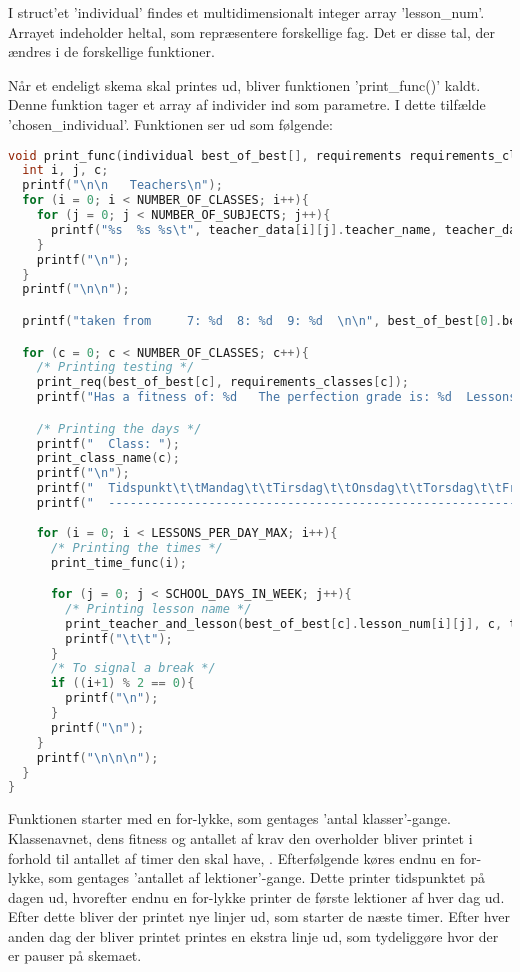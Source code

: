 I struct’et ’individual’ findes et multidimensionalt integer array ’lesson\_num’. Arrayet indeholder heltal, som repræsentere forskellige fag. Det er disse tal, der ændres i de forskellige funktioner. 

Når et endeligt skema skal printes ud, bliver funktionen ’print\_func()’ kaldt. Denne funktion tager et array af individer ind som parametre. I dette tilfælde ’chosen\_individual’. Funktionen ser ud som følgende:
\begin{lstlisting}[language = C]
void print_func(individual best_of_best[], requirements requirements_classes[], int generation_print, teacher teacher_data[][NUMBER_OF_SUBJECTS]){
  int i, j, c;
  printf("\n\n   Teachers\n");
  for (i = 0; i < NUMBER_OF_CLASSES; i++){
    for (j = 0; j < NUMBER_OF_SUBJECTS; j++){
      printf("%s  %s %s\t", teacher_data[i][j].teacher_name, teacher_data[i][j].lesson_name, teacher_data[i][j].class_name);
    }
    printf("\n");
  }
  printf("\n\n");

  printf("taken from     7: %d  8: %d  9: %d  \n\n", best_of_best[0].best_gena7, best_of_best[0].best_gena8, best_of_best[0].best_gena9);

  for (c = 0; c < NUMBER_OF_CLASSES; c++){
    /* Printing testing */
    print_req(best_of_best[c], requirements_classes[c]);
    printf("Has a fitness of: %d   The perfection grade is: %d  Lessons with parallel: %d  Lessons With Both: %d  Heavy lessons after: %d Before: %d   Overbooked: %d \n\n", best_of_best[c].fitness, best_of_best[c].perfection, best_of_best[c].lessons_with_parallel, best_of_best[c].lessons_with_both, best_of_best[c].heavy_lesson_after, best_of_best[c].heavy_lesson_before, best_of_best[c].teacher_overbooked);

    /* Printing the days */
    printf("  Class: ");
    print_class_name(c);
    printf("\n");
    printf("  Tidspunkt\t\tMandag\t\tTirsdag\t\tOnsdag\t\tTorsdag\t\tFredag\n");
    printf("  ------------------------------------------------------------------------------------------------\n");
    
    for (i = 0; i < LESSONS_PER_DAY_MAX; i++){
      /* Printing the times */
      print_time_func(i);

      for (j = 0; j < SCHOOL_DAYS_IN_WEEK; j++){
        /* Printing lesson name */
        print_teacher_and_lesson(best_of_best[c].lesson_num[i][j], c, teacher_data);
        printf("\t\t");
      }
      /* To signal a break */
      if ((i+1) % 2 == 0){
        printf("\n");
      }
      printf("\n");
    }
    printf("\n\n\n");
  }
}
\end{lstlisting}

Funktionen starter med en for-lykke, som gentages ’antal klasser’-gange. Klassenavnet, dens fitness og antallet af krav den overholder bliver printet i forhold til antallet af timer den skal have, . 
Efterfølgende køres endnu en for-lykke, som gentages ’antallet af lektioner’-gange. Dette printer tidspunktet på dagen ud, hvorefter endnu en for-lykke printer de første lektioner af hver dag ud.
Efter dette bliver der printet nye linjer ud, som starter de næste timer. Efter hver anden dag der bliver printet printes en ekstra linje ud, som tydeliggøre hvor der er pauser på skemaet.
